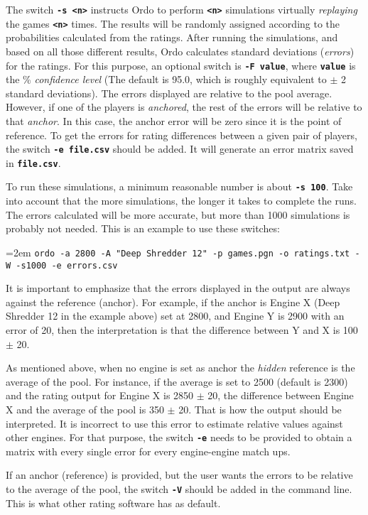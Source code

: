 \documentclass[12pt]{article}
\newcommand{\swtch} [1] {\texttt{\textbf{#1}}}
\newcommand{\cmdln}[1]{
	\par
	\begingroup
		\leftskip=2em
		\addtolength{\rightskip}{0em}
		\noindent \small{\texttt{#1}}
		\par
	\endgroup
}
\begin{document}
The switch \swtch{-s~<n>} instructs Ordo to perform \swtch{<n>} simulations virtually \textit{replaying} the games \swtch{<n>} times.
The results will be randomly assigned according to the probabilities calculated from the ratings. 
After running the simulations, and based on all those different results, Ordo calculates standard deviations (\textit{errors}) for the ratings.
For this purpose, an optional switch is \swtch{-F~value}, where \swtch{value} is the \% \textit{confidence level} (The default is 95.0, which is roughly equivalent to $\pm$ 2 standard deviations).
The errors displayed are relative to the pool average. 
However, if one of the players is \textit{anchored}, the rest of the errors will be relative to that \textit{anchor}.
In this case, the anchor error will be zero since it is the point of reference.
To get the errors for rating differences between a given pair of players, the switch \swtch{-e~file.csv} should be added.
It will generate an error matrix saved in \swtch{file.csv}.

To run these simulations, a minimum reasonable number is about \swtch{-s~100}. 
Take into account that the more simulations, the longer it takes to complete the runs. 
The errors calculated will be more accurate, but more than 1000 simulations is probably not needed. 
This is an example to use these switches:

\cmdln{ordo -a 2800 -A "Deep Shredder 12" -p games.pgn -o ratings.txt -W -s1000 -e errors.csv}

It is important to emphasize that the errors displayed in the output are always against the reference (anchor). 
For example, if the anchor is Engine X (Deep Shredder 12 in the example above) set at 2800, and Engine Y is 2900 with an error of 20, then the interpretation is that the difference between Y and X is 100 $\pm$ 20. 

As mentioned above, when no engine is set as anchor the \textit{hidden} reference is the average of the pool. 
For instance, if the average is set to 2500 (default is 2300) and the rating output for Engine X is 2850 $\pm$ 20, the difference between Engine X and the average of the pool is 350 $\pm$ 20. 
That is how the output should be interpreted. 
It is incorrect to use this error to estimate relative values against other engines. 
For that purpose, the switch \swtch{-e} needs to be provided to obtain a matrix with every single error for every engine-engine match ups.

If an anchor (reference) is provided, but the user wants the errors to be relative to the average of the pool, the switch \swtch{-V} should be added in the command line. This is what other rating software has as default.
\end{document}
